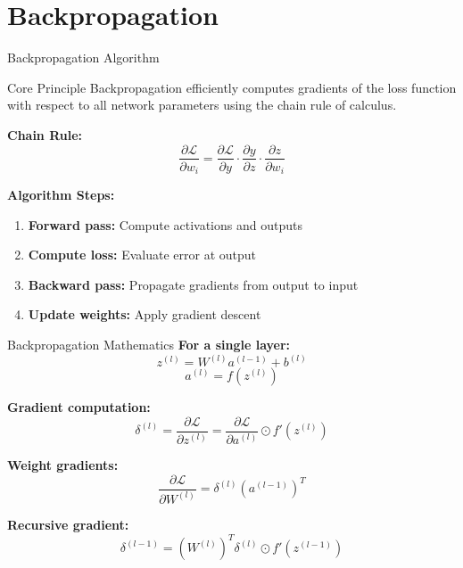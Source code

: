\documentclass[aspectratio=169,10pt]{beamer}
\begin{document}
\section{Backpropagation}

\begin{frame}{Backpropagation Algorithm}
\begin{alertblock}{Core Principle}
Backpropagation efficiently computes gradients of the loss function with respect to all network parameters using the chain rule of calculus.
\end{alertblock}

\textbf{Chain Rule:}
$$\frac{\partial \mathcal{L}}{\partial w_i} = \frac{\partial \mathcal{L}}{\partial y} \cdot \frac{\partial y}{\partial z} \cdot \frac{\partial z}{\partial w_i}$$

\textbf{Algorithm Steps:}
\begin{enumerate}
\item \textbf{Forward pass:} Compute activations and outputs
\item \textbf{Compute loss:} Evaluate error at output
\item \textbf{Backward pass:} Propagate gradients from output to input
\item \textbf{Update weights:} Apply gradient descent
\end{enumerate}
\end{frame}

\begin{frame}{Backpropagation Mathematics}
\textbf{For a single layer:}
$$z^{(l)} = W^{(l)}a^{(l-1)} + b^{(l)}$$
$$a^{(l)} = f(z^{(l)})$$

\textbf{Gradient computation:}
$$\delta^{(l)} = \frac{\partial \mathcal{L}}{\partial z^{(l)}} = \frac{\partial \mathcal{L}}{\partial a^{(l)}} \odot f'(z^{(l)})$$

\textbf{Weight gradients:}
$$\frac{\partial \mathcal{L}}{\partial W^{(l)}} = \delta^{(l)} (a^{(l-1)})^T$$

\textbf{Recursive gradient:}
$$\delta^{(l-1)} = (W^{(l)})^T \delta^{(l)} \odot f'(z^{(l-1)})$$
\end{frame}
\end{document}
